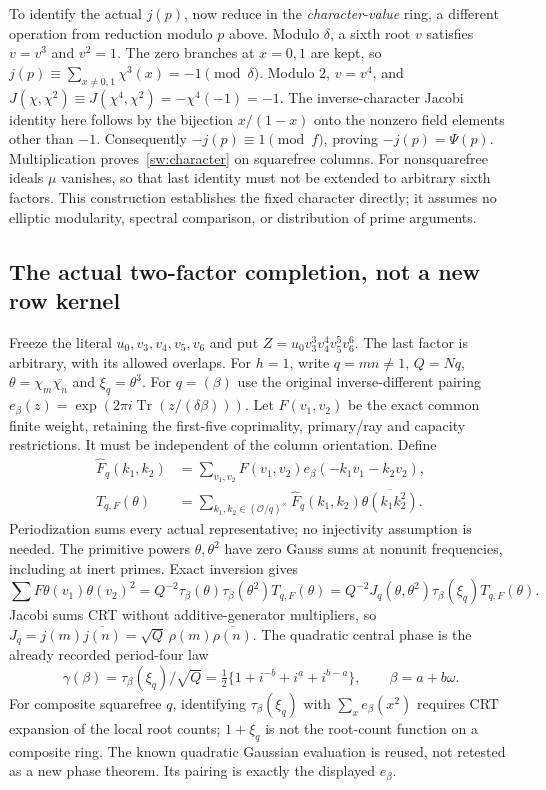 \documentclass[11pt]{article}
\theoremstyle{definition}\newtheorem{definition}[theorem]{Definition}
\theoremstyle{remark}\newtheorem{remark}[theorem]{Remark}
\begin{document}
To identify the actual $j(p)$, now reduce in the \emph{character-value}
ring, a different operation from reduction modulo $p$ above.
Modulo $\delta$, a sixth root $v$ satisfies $v=v^3$ and $v^2=1$.
The zero branches at $x=0,1$ are kept, so
$j(p)\equiv\sum_{x\ne0,1}\chi^3(x)=-1\pmod\delta$.
Modulo $2$, $v=v^4$, and
$J(\chi,\chi^2)\equiv J(\chi^4,\chi^2)=-\chi^4(-1)=-1$.
The inverse-character Jacobi identity here follows by the bijection
$x/(1-x)$ onto the nonzero field elements other than $-1$.
Consequently $-j(p)\equiv1\pmod f$, proving $-j(p)=\Psi(p)$.
Multiplication proves~\eqref{sw:character} on squarefree columns.
For nonsquarefree ideals $\mu$ vanishes, so that last identity must not
be extended to arbitrary sixth factors. This construction establishes the
fixed character directly; it assumes no elliptic modularity, spectral
comparison, or distribution of prime arguments.

\subsection{The actual two-factor completion, not a new row kernel}
Freeze the literal $u_0,v_3,v_4,v_5,v_6$ and put
$Z=u_0v_3^3v_4^4v_5^5v_6^6$. The last factor is arbitrary, with its allowed
overlaps. For $h=1$, write $q=mn\ne1$, $Q=Nq$,
$\theta=\chi_m\overline{\chi_n}$ and $\xi_q=\theta^3$.
For $q=(\beta)$ use the original inverse-different pairing
$e_\beta(z)=\exp(2\pi i\operatorname{Tr}(z/(\delta\beta)))$.
Let $F(v_1,v_2)$ be the exact common finite weight, retaining the first-five
coprimality, primary/ray and capacity restrictions. It must be independent
of the column orientation. Define
\begin{align*}
 \widehat F_q(k_1,k_2)&=\sum_{v_1,v_2}F(v_1,v_2)
                       e_\beta(-k_1v_1-k_2v_2),\\
 T_{q,F}(\theta)&=\sum_{k_1,k_2\in(\mathcal O/q)^\times}
           \widehat F_q(k_1,k_2)\overline{\theta(k_1k_2^2)}.
\end{align*}
Periodization sums every actual representative; no injectivity assumption
is needed. The primitive powers $\theta,\theta^2$ have zero Gauss sums
at nonunit frequencies, including at inert primes. Exact inversion gives
\[
 \sum F\theta(v_1)\theta(v_2)^2
  =Q^{-2}\tau_\beta(\theta)\tau_\beta(\theta^2)T_{q,F}(\theta)
  =Q^{-2}J_q(\theta,\theta^2)\tau_\beta(\xi_q)T_{q,F}(\theta).
\]
Jacobi sums CRT without additive-generator multipliers, so
$J_q=j(m)\overline{j(n)}=\sqrt Q\,\rho(m)\overline{\rho(n)}$.
The quadratic central phase is the already recorded period-four law
\[
 \gamma(\beta)=\tau_\beta(\xi_q)/\sqrt Q
     =\tfrac12\{1+i^{-b}+i^a+i^{b-a}\},\qquad \beta=a+b\omega.
\]
For composite squarefree $q$, identifying $\tau_\beta(\xi_q)$ with
$\sum_xe_\beta(x^2)$ requires CRT expansion of the local root counts;
$1+\xi_q$ is not the root-count function on a composite ring.
The known quadratic Gaussian evaluation is reused, not retested as a new
phase theorem. Its pairing is exactly the displayed $e_\beta$.
\end{document}
